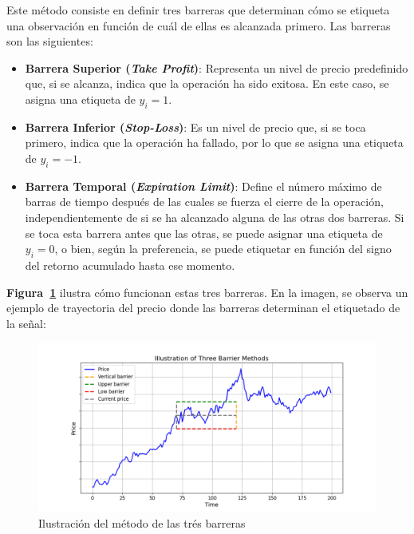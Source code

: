 \documentclass[a4paper,12pt, twoside]{report}
\begin{document}
Este método consiste en definir tres barreras que determinan cómo se etiqueta 
una observación en función de cuál de ellas es alcanzada primero. Las barreras 
son las siguientes:

\begin{itemize}
    \item \textbf{Barrera Superior (\textit{Take Profit})}: Representa un nivel 
    de precio predefinido que, si se alcanza, indica que la operación ha sido 
    exitosa. En este caso, se asigna una etiqueta de $y_i = 1$.
    \item \textbf{Barrera Inferior (\textit{Stop-Loss})}: Es un nivel de 
    precio que, si se toca primero, indica que la operación ha fallado, por lo 
    que se asigna una etiqueta de $y_i = -1$.
    \item \textbf{Barrera Temporal (\textit{Expiration Limit})}: Define el número 
    máximo de barras de tiempo después de las cuales se fuerza el cierre de la
    operación, independientemente de si se ha alcanzado alguna de las otras dos 
    barreras. Si se toca esta barrera antes que las otras, se puede asignar 
    una etiqueta de $y_i = 0$, o bien, según la preferencia, se puede etiquetar 
    en función del signo del retorno acumulado hasta ese momento.
\end{itemize}

\textbf{Figura~\ref{fig:three_barrier_method}} ilustra cómo funcionan estas tres 
barreras. En la imagen, se observa un ejemplo de trayectoria del precio donde las 
barreras determinan el etiquetado de la señal:

\begin{figure}[H]
    \centering
    \includegraphics[width=1\textwidth]{./figures/three_barried_method.png}
    \caption{Ilustración del método de las trés barreras}
    \label{fig:three_barrier_method}
\end{figure}
\end{document}
